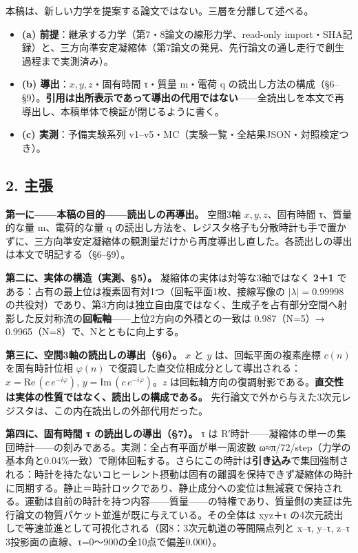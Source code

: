 \documentclass[
  a4paper,
]{ltjsarticle}
\providecommand{\tightlist}{%
  \setlength{\itemsep}{0pt}\setlength{\parskip}{0pt}}
\begin{document}
本稿は、新しい力学を提案する論文ではない。三層を分離して述べる。

\begin{itemize}
\tightlist
\item
  \textbf{(a) 前提}：継承する力学（第7・8論文の線形力学、read-only
  import・SHA記録）と、三方向準安定凝縮体（第7論文の発見、先行論文の通し走行で創生過程まで実測済み）。
\item
  \textbf{(b) 導出}：\(x, y, z\)・固有時間 τ・質量 m・電荷 q
  の読出し方法の構成（§6--§9）。\textbf{引用は出所表示であって導出の代用ではない}------全読出しを本文で再導出し、本稿単体で検証が閉じるように書く。
\item
  \textbf{(c) 実測}：予備実験系列
  v1--v5・MC（実験一覧・全結果JSON・対照検定つき）。
\end{itemize}

\subsection{2. 主張}\label{ux4e3bux5f35}

\textbf{第一に------本稿の目的------読出しの再導出。} 空間3軸
\(x,y,z\)、固有時間 τ、質量的な量 m、電荷的な量 q
の読出し方法を、レジスタ格子も分散時計も手で置かずに、三方向準安定凝縮体の観測量だけから再度導出し直した。各読出しの導出は本文で明記する（§6--§9）。

\textbf{第二に、実体の構造（実測、§5）。}
凝縮体の実体は対等な3軸ではなく \textbf{2＋1}
である：占有の最上位は複素固有対1つ（回転平面1枚、接線写像の
\(|\lambda|=0.99998\)
の共役対）であり、第3方向は独立自由度ではなく、生成子を占有部分空間へ射影した反対称流の\textbf{回転軸}------上位2方向の外積との一致は
0.987（N=5）→ 0.9965（N=8）で、Nとともに向上する。

\textbf{第三に、空間3軸の読出しの導出（§6）。} \(x\) と \(y\)
は、回転平面の複素座標 \(c(n)\) を固有時計位相 \(\varphi(n)\)
で復調した直交位相成分として導出される：\(x=\mathrm{Re}\,(c\,e^{-i\varphi})\),
\(y=\mathrm{Im}\,(c\,e^{-i\varphi})\)。\(z\)
は回転軸方向の復調射影である。\textbf{直交性は実体の性質ではなく、読出しの構成である。}
先行論文で外から与えた3次元レジスタは、この内在読出しの外部代用だった。

\textbf{第四に、固有時間 τ の読出しの導出（§7）。} τ は
R′時計------凝縮体の単一の集団時計------の刻みである。実測：全占有平面が単一周波数
ω≈π/72/step（力学の基本角と0.04\%一致）で剛体回転する。さらにこの時計は\textbf{引き込み}で集団強制される：時計を持たないコヒーレント摂動は固有の離調を保持できず凝縮体の時計に同期する。静止＝時計ロックであり、静止成分への変位は無減衰で保持される。運動は自前の時計を持つ内容------質量------の特権であり、質量側の実証は先行論文の物質パケット並進が既に与えている。その全体は
xyz＋τ
の4次元読出しで等速並進として可視化される（図8：3次元軌道の等間隔点列と
x--τ, y--τ, z--τ 3投影面の直線、τ=0〜900の全10点で偏差0.000）。
\end{document}
